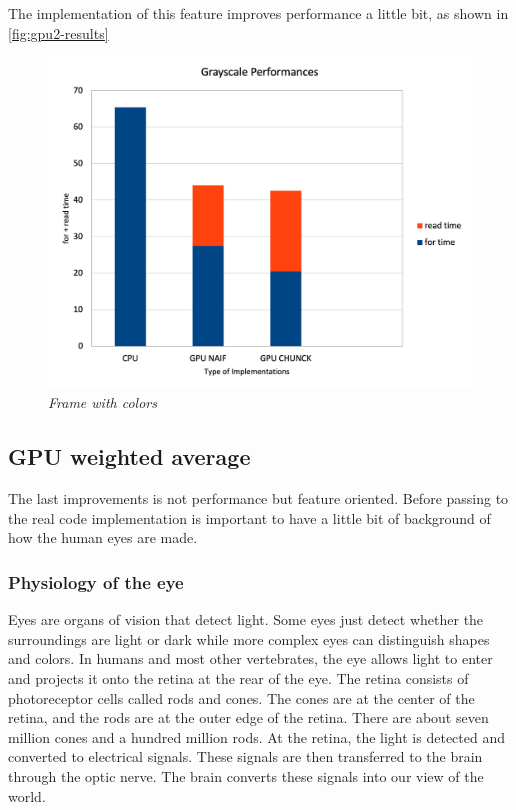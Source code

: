 \documentclass[paper=a4, fontsize=10pt]{scrartcl}	%
\begin{document}
	The implementation of this feature improves performance a little bit, as shown in \autoref{fig:gpu2-results}

	\begin{figure}[H]
		\centering
		\includegraphics[width=0.65\linewidth]{images/bw/Picture 3.png}
		\caption{\textit{Frame with colors}}
		\label{fig:gpu2-results}
	\end{figure}


	\subsection{GPU weighted average}

	The last improvements is not performance but feature oriented. Before passing to the real code implementation is important to have a little bit of background of how the human eyes are made.

	\subsubsection{Physiology of the eye}
	\label{sec:eye}

	
	Eyes are organs of vision that detect light. Some eyes just detect whether the surroundings are light or dark while more complex eyes can distinguish shapes and colors. In humans and most other vertebrates, the eye allows light to enter and projects it onto the retina at the rear of the eye. The retina consists of photoreceptor cells called rods and cones. The cones are at the center of the retina, and the rods are at the outer edge of the retina. There are about seven million cones and a hundred million rods. At the retina, the light is detected and converted to electrical signals. These signals are then transferred to the brain through the optic nerve. The brain converts these signals into our view of the world.
\end{document}
